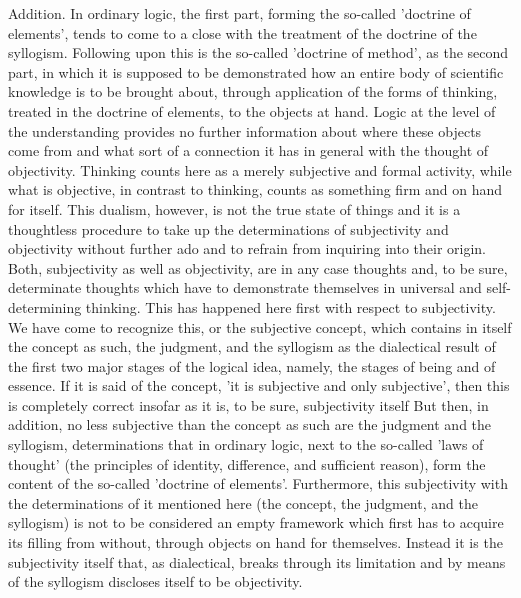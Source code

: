 Addition. In ordinary logic, the first part, forming the so-called 'doctrine of elements',
tends to come to a close with the treatment of the doctrine of the syllogism.
Following upon this is the so-called 'doctrine of method', as the second part,
in which it is supposed to be demonstrated how an entire body of scientific
knowledge is to be brought about, through application of the forms of thinking,
treated in the doctrine of elements, to the objects at hand. Logic at the level
of the understanding provides no further information about where these objects
come from and what sort of a connection it has in general with the thought of
objectivity. Thinking counts here as a merely subjective and formal activity, while
what is objective, in contrast to thinking, counts as something firm and on hand
for itself. This dualism, however, is not the true state of things and
it is a thoughtless procedure to take up the determinations of subjectivity and
objectivity without further ado and to refrain from inquiring into their origin.
Both, subjectivity as well as objectivity, are in any case thoughts and, to be sure,
determinate thoughts which have to demonstrate themselves in universal and self-
determining thinking. This has happened here first with respect to subjectivity.
We have come to recognize this, or the subjective concept, which contains in itself
the concept as such, the judgment, and the syllogism as the dialectical result of
the first two major stages of the logical idea, namely, the stages of being and of
essence. If it is said of the concept, 'it is subjective and only subjective', then this
is completely correct insofar as it is, to be sure, subjectivity itself But then, in
addition, no less subjective than the concept as such are the judgment and the
syllogism, determinations that in ordinary logic, next to the so-called 'laws of
thought' (the principles of identity, difference, and sufficient reason), form the
content of the so-called 'doctrine of elements'. Furthermore, this subjectivity with
the determinations of it mentioned here (the concept, the judgment, and the
syllogism) is not to be considered an empty framework which first has to acquire
its filling from without, through objects on hand for themselves. Instead it is the
subjectivity itself that, as dialectical, breaks through its limitation and by means
of the syllogism discloses itself to be objectivity.
